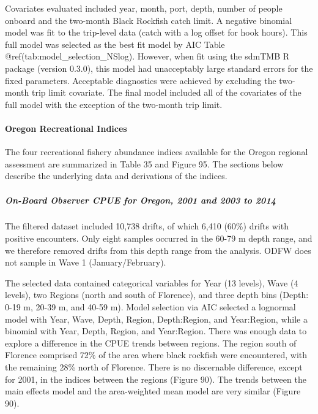 \documentclass[11pt,
  english,
  letterpaper,
]{article}
\begin{document}
Covariates evaluated included year, month, port, depth, number of people onboard and the two-month Black Rockfish catch limit. A negative binomial model was fit to the trip-level data (catch with a log offset for hook hours). This full model was selected as the best fit model by AIC Table @ref(tab:model\_selection\_NSlog). However, when fit using the sdmTMB R package (version 0.3.0), this model had unacceptably large standard errors for the fixed parameters. Acceptable diagnostics were achieved by excluding the two-month trip limit covariate. The final model included all of the covariates of the full model with the exception of the two-month trip limit.

\hypertarget{oregon-recreational-indices}{%
\paragraph{Oregon Recreational Indices}\label{oregon-recreational-indices}}

The four recreational fishery abundance indices available for the Oregon regional assessment are summarized in Table 35 and Figure 95. The sections below describe the underlying data and derivations of the indices.

\hypertarget{on-board-observer-cpue-for-oregon-2001-and-2003-to-2014}{%
\subparagraph{On-Board Observer CPUE for Oregon, 2001 and 2003 to 2014}\label{on-board-observer-cpue-for-oregon-2001-and-2003-to-2014}}

The filtered dataset included 10,738 drifts, of which 6,410 (60\%) drifts with positive encounters. Only eight samples occurred in the 60-79 m depth range, and we therefore removed drifts from this depth range from the analysis. ODFW does not sample in Wave 1 (January/February).

The selected data contained categorical variables for Year (13 levels), Wave (4 levels), two Regions (north and south of Florence), and three depth bins (Depth: 0-19 m, 20-39 m, and 40-59 m). Model selection via AIC selected a lognormal model with Year, Wave, Depth, Region, Depth:Region, and Year:Region, while a binomial with Year, Depth, Region, and Year:Region. There was enough data to explore a difference in the CPUE trends between regions. The region south of Florence comprised 72\% of the area where black rockfish were encountered, with the remaining 28\% north of Florence. There is no discernable difference, except for 2001, in the indices between the regions (Figure 90). The trends between the main effects model and the area-weighted mean model are very similar (Figure 90).
\end{document}
